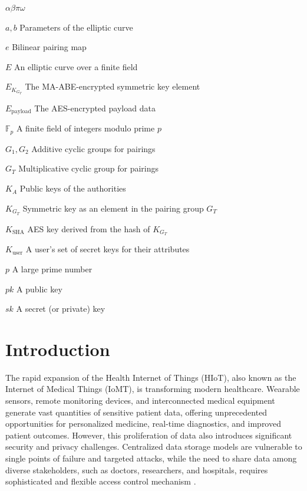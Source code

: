 \documentclass[cic,tc,english]{iiufrgs}
\numberwithin{algorithm}{chapter}
\begin{document}
\begin{listofsymbols}{$\alpha\beta\pi\omega$}
    \item[$a, b$] Parameters of the elliptic curve
    \item[$e$] Bilinear pairing map
    \item[$E$] An elliptic curve over a finite field
    \item[$E_{K_{G_T}}$] The MA-ABE-encrypted symmetric key element
    \item[$E_{\text{payload}}$] The AES-encrypted payload data
    \item[$\mathbb{F}_p$] A finite field of integers modulo prime $p$
    \item[$G_1, G_2$] Additive cyclic groups for pairings
    \item[$G_T$] Multiplicative cyclic group for pairings
    \item[$K_A$] Public keys of the authorities
    \item[$K_{G_T}$] Symmetric key as an element in the pairing group $G_T$
    \item[$K_{\text{SHA}}$] AES key derived from the hash of $K_{G_T}$
    \item[$K_{\text{user}}$] A user's set of secret keys for their attributes
    \item[$p$] A large prime number
    \item[$pk$] A public key
    \item[$sk$] A secret (or private) key
\end{listofsymbols}

\tableofcontents


\chapter{Introduction}
\label{chap:introduction}
    The rapid expansion of the Health Internet of Things (HIoT), also known as the Internet of Medical Things (IoMT), is transforming modern healthcare. Wearable sensors, remote monitoring devices, and interconnected medical equipment generate vast quantities of sensitive patient data, offering unprecedented opportunities for personalized medicine, real-time diagnostics, and improved patient outcomes. However, this proliferation of data also introduces significant security and privacy challenges. Centralized data storage models are vulnerable to single points of failure and targeted attacks, while the need to share data among diverse stakeholders, such as doctors, researchers, and hospitals, requires sophisticated and flexible access control mechanism \cite{minicurso-sbcas}.
\end{document}

